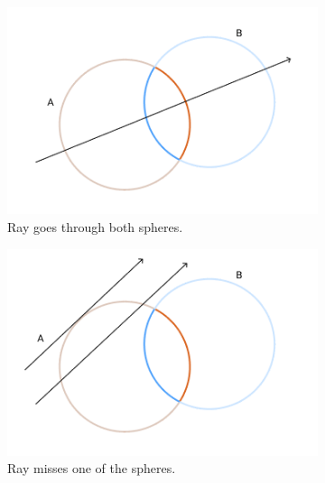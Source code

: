\documentclass[a4paper,11pt,oneside]{article}
\begin{document}
\begin{figure}[ht]
     \centering
     \begin{subfigure}[b]{0.3\textwidth}
         \centering
         \includegraphics[width=\textwidth]{section3/3.4/sphere_intersection_case1.png}
         \caption{Ray goes through both spheres.}
         \label{sec3.4:intersection_case1}
     \end{subfigure}
     \hfill
     \begin{subfigure}[b]{0.3\textwidth}
         \centering
         \includegraphics[width=\textwidth]{section3/3.4/sphere_intersection_case2.png}
         \caption{Ray misses one of the spheres.}
          \label{sec3.4:intersection_case2}
     \end{subfigure}
     \hfill
     \begin{subfigure}[b]{0.3\textwidth}
         \centering

\end{subfigure}
\end{figure}
\end{document}
